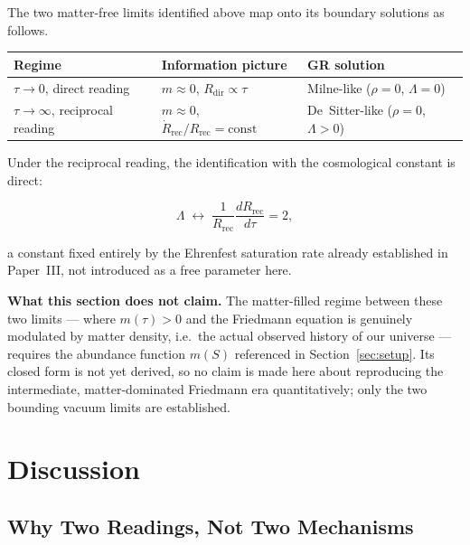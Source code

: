 \documentclass[11pt]{article}
\begin{document}
The two matter-free limits identified above map onto its boundary
solutions as follows.

\begin{center}
\begin{tabular}{lll}
\hline
\textbf{Regime} & \textbf{Information picture} & \textbf{GR solution} \\
\hline
$\tau\to 0$, direct reading & $m\approx0$, $R_{\text{dir}}\propto\tau$
  & Milne-like ($\rho=0$, $\Lambda=0$) \\
$\tau\to\infty$, reciprocal reading & $m\approx0$,
  $\dot R_{\text{rec}}/R_{\text{rec}}=\text{const}$
  & De~Sitter-like ($\rho=0$, $\Lambda>0$) \\
\hline
\end{tabular}
\end{center}

Under the reciprocal reading, the identification with the cosmological
constant is direct:

\begin{equation}
  \Lambda \;\longleftrightarrow\; \frac{1}{R_{\text{rec}}}
  \frac{dR_{\text{rec}}}{d\tau} = 2,
  \label{eq:lambda_map}
\end{equation}

a constant fixed entirely by the Ehrenfest saturation rate already
established in Paper~III, not introduced as a free parameter here.

\textbf{What this section does not claim.} The matter-filled regime
between these two limits --- where $m(\tau)>0$ and the Friedmann
equation is genuinely modulated by matter density, i.e.\ the actual
observed history of our universe --- requires the abundance function
$m(S)$ referenced in Section~\ref{sec:setup}. Its closed form is not yet
derived, so no claim is made here about reproducing the intermediate,
matter-dominated Friedmann era quantitatively; only the two bounding
vacuum limits are established.

\section{Discussion}
\label{sec:discussion}

\subsection{Why Two Readings, Not Two Mechanisms}
\end{document}
